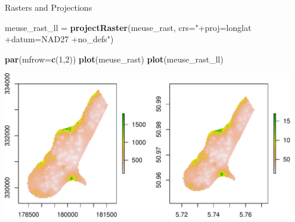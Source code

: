 \documentclass[11pt,ignorenonframetext,]{beamer}
\newenvironment{Shaded}{}{}
\newcommand{\KeywordTok}[1]{\textcolor[rgb]{0.00,0.44,0.13}{\textbf{#1}}}
\newcommand{\DataTypeTok}[1]{\textcolor[rgb]{0.56,0.13,0.00}{#1}}
\newcommand{\DecValTok}[1]{\textcolor[rgb]{0.25,0.63,0.44}{#1}}
\newcommand{\StringTok}[1]{\textcolor[rgb]{0.25,0.44,0.63}{#1}}
\newcommand{\NormalTok}[1]{#1}
\let\oldShaded\Shaded
\let\endoldShaded\endShaded
\renewenvironment{Shaded}{\footnotesize\begin{spacing}{0.9}\oldShaded}{\endoldShaded\end{spacing}}
\let\oldverbatim\verbatim
\let\endoldverbatim\endverbatim
\newcommand{\scriptoutput}{
  \renewenvironment{Shaded}{\scriptsize\begin{spacing}{0.9}\oldShaded}{\endoldShaded\end{spacing}}
  \renewenvironment{verbatim}{\scriptsize\begin{spacing}{0.9}\oldverbatim}{\endoldverbatim\end{spacing}}
}
\begin{document}
\begin{frame}[fragile,t]{Rasters and Projections}

\scriptoutput

\begin{Shaded}
\begin{Highlighting}[]
\NormalTok{meuse_rast_ll =}\StringTok{ }\KeywordTok{projectRaster}\NormalTok{(meuse_rast, }\DataTypeTok{crs=}\StringTok{"+proj=longlat +datum=NAD27 +no_defs"}\NormalTok{)}

\KeywordTok{par}\NormalTok{(}\DataTypeTok{mfrow=}\KeywordTok{c}\NormalTok{(}\DecValTok{1}\NormalTok{,}\DecValTok{2}\NormalTok{))}
\KeywordTok{plot}\NormalTok{(meuse_rast)}
\KeywordTok{plot}\NormalTok{(meuse_rast_ll)}
\end{Highlighting}
\end{Shaded}

\begin{center}\includegraphics[width=0.95\textwidth]{Lec17_files/figure-beamer/unnamed-chunk-35-1} \end{center}

\end{frame}
\end{document}
